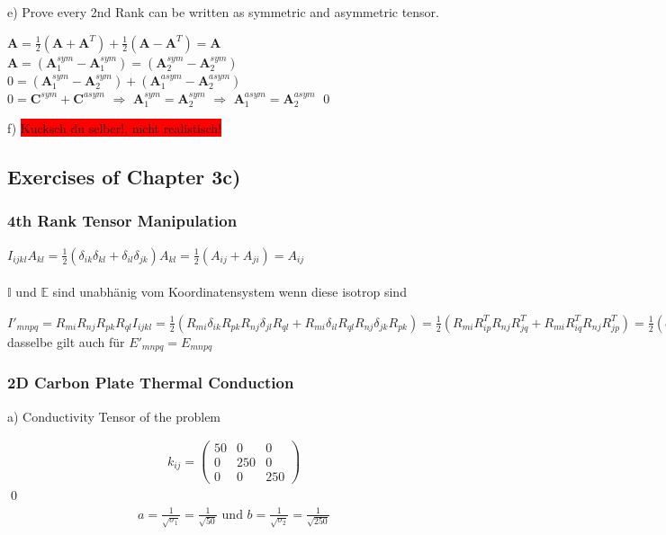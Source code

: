 e) Prove every 2nd Rank can be written as symmetric and asymmetric tensor.

$\mathbf{A}=\frac{1}{2}\left(\mathbf{A} + \mathbf{A}^T\right)+
\frac{1}{2}\left(\mathbf{A}-\mathbf{A}^T\right) = \mathbf{A}$ \\
$\mathbf{A}=\left(\mathbf{A}_1^{sym}-\mathbf{A}_1^{sym}\right)=\left(\mathbf{A}_2^{sym}-\mathbf{A}_2^{sym}\right)$
\\
$0=\left(\mathbf{A}_1^{sym}-\mathbf{A}_2^{sym}\right)+\left(\mathbf{A}_1^{asym}-\mathbf{A}_2^{asym}\right)$
\\
$0=\mathbf{C}^{sym}+\mathbf{C}^{asym}$ $\Rightarrow$
$\mathbf{A}_1^{sym}=\mathbf{A}_2^{sym}$ $\Rightarrow$
$\mathbf{A}_1^{asym}=\mathbf{A}_2^{asym}$ \qed


f) \colorbox{red}{Kucksch du selber!, nicht realistisch!}




\subsection{Exercises of Chapter 3c)}

\subsubsection{4th Rank Tensor Manipulation}


$I_{ijkl}A_{kl}=\frac{1}{2}(\delta_{ik}\delta_{kl}+\delta_{il}\delta_{jk})A_{kl}=\frac{1}{2}(A_{ij}+A_{ji})=A_{ij}$
\\
\\
$ \mathbb{I} $ und $ \mathbb{E} $ sind unabhänig vom Koordinatensystem wenn diese isotrop sind

$ I'_{mnpq}=R_{mi}R_{nj}R_{pk}R_{ql}I_{ijkl} = \frac{1}{2}(R_{mi}\delta_{ik}R_{pk}R_{nj}\delta_{jl}R_{ql} + R_{mi}\delta_{il}R_{ql}R_{nj}\delta_{jk}R_{pk})= \frac{1}{2}(R_{mi}R^T_{ip}R_{nj}R^T_{jq}+R_{mi}R^T_{iq}R_{nj}R^T_{jp})= \frac{1}{2}(\delta_{mp}\delta_{mq}\delta_{np})=I_{mnpq} $ dasselbe gilt auch für $ E'_{mnpq}=E_{mnpq}$


\subsubsection{2D Carbon Plate Thermal Conduction} %

a) Conductivity Tensor of the problem

\begin{align}
k_{ij}=\begin{pmatrix}
50 & 0 & 0 \\
0 & 250 & 0 \\
0 & 0 & 250 
\end{pmatrix}
\end{align}
\qed
\begin{align}
a = \frac{1}{\sqrt{\sigma_1}} = \frac{1}{\sqrt{50}} \text{ und } b =
\frac{1}{\sqrt{\sigma_2}} = \frac{1}{\sqrt{250}}
\end{align}

